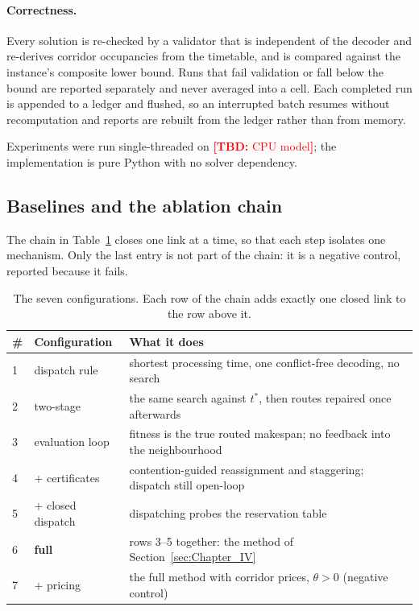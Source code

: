 \documentclass[manuscript,screen,review]{acmart}
\newcommand{\TBD}[1]{\textcolor{red}{\textbf{[TBD:} #1\textbf{]}}}
\begin{document}
\paragraph{Correctness.}
Every solution is re-checked by a validator that is independent of the decoder
and re-derives corridor occupancies from the timetable, and is compared against
the instance's composite lower bound. Runs that fail validation or fall below
the bound are reported separately and never averaged into a cell. Each
completed run is appended to a ledger and flushed, so an interrupted batch
resumes without recomputation and reports are rebuilt from the ledger rather
than from memory.

Experiments were run single-threaded on \TBD{CPU model}; the implementation is
pure Python with no solver dependency.

\subsection{Baselines and the ablation chain}
\label{sec:arms}

The chain in Table~\ref{tab:arms} closes one link at a time, so that each step
isolates one mechanism. Only the last entry is not part of the chain: it is a
negative control, reported because it fails.

\begin{table}[t]
\caption{The seven configurations. Each row of the chain adds exactly one
closed link to the row above it.}
\label{tab:arms}
\footnotesize
\begin{tabular}{@{}llp{4.3cm}@{}}
\toprule
\# & Configuration & What it does \\
\midrule
1 & dispatch rule & shortest processing time, one conflict-free decoding, no
    search \\
2 & two-stage & the same search against $t^{*}$, then routes repaired once
    afterwards \\
3 & evaluation loop & fitness is the true routed makespan; no feedback into
    the neighbourhood \\
4 & + certificates & contention-guided reassignment and staggering; dispatch
    still open-loop \\
5 & + closed dispatch & dispatching probes the reservation table \\
6 & \textbf{full} & rows 3--5 together: the method of
    Section~\ref{sec:Chapter_IV} \\
\midrule
7 & + pricing & the full method with corridor prices, $\theta>0$
    (negative control) \\
\bottomrule
\end{tabular}
\end{table}
\end{document}
